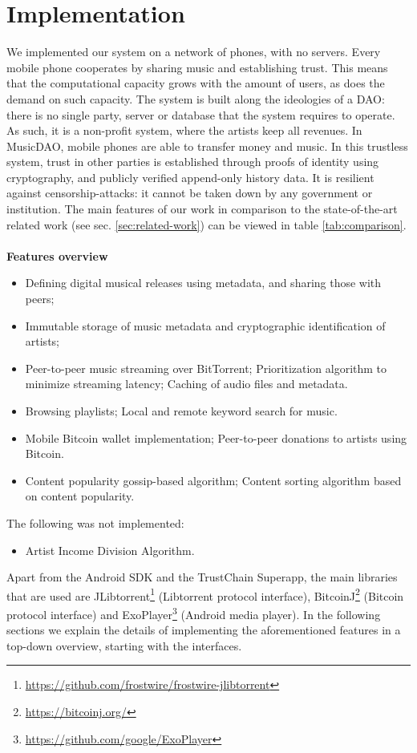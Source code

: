 \chapter{Implementation}
We implemented our system on a network of phones, with no servers. Every mobile phone cooperates by sharing music and establishing trust. This means that the computational capacity grows with the amount of users, as does the demand on such capacity. The system is built along the ideologies of a DAO: there is no single party, server or database that the system requires to operate. As such, it is a non-profit system, where the artists keep all revenues. In MusicDAO, mobile phones are able to transfer money and music. In this trustless system, trust in other parties is established through proofs of identity using cryptography, and publicly verified append-only history data. It is resilient against censorship-attacks: it cannot be taken down by any government or institution. The main features of our work in comparison to the state-of-the-art related work (see sec. \ref{sec:related-work}) can be viewed in table \ref{tab:comparison}.
\\
\\
\textbf{Features overview}
\begin{itemize}
    \item Defining digital musical releases using metadata, and sharing those with peers;
    \item Immutable storage of music metadata and cryptographic identification of artists;
    \item Peer-to-peer music streaming over BitTorrent; Prioritization algorithm to minimize streaming latency; Caching of audio files and metadata.
    \item Browsing playlists; Local and remote keyword search for music.
    \item Mobile Bitcoin wallet implementation; Peer-to-peer donations to artists using Bitcoin.
    \item Content popularity gossip-based algorithm; Content sorting algorithm based on content popularity.
\end{itemize}
The following was not implemented:
\begin{itemize}
    \item Artist Income Division Algorithm.
\end{itemize}
Apart from the Android SDK and the TrustChain Superapp, the main libraries that are used are JLibtorrent\footnote{\url{https://github.com/frostwire/frostwire-jlibtorrent}} (Libtorrent protocol interface), BitcoinJ\footnote{\url{https://bitcoinj.org/}} (Bitcoin protocol interface) and ExoPlayer\footnote{\url{https://github.com/google/ExoPlayer}} (Android media player). In the following sections we explain the details of implementing the aforementioned features in a top-down overview, starting with the interfaces.

